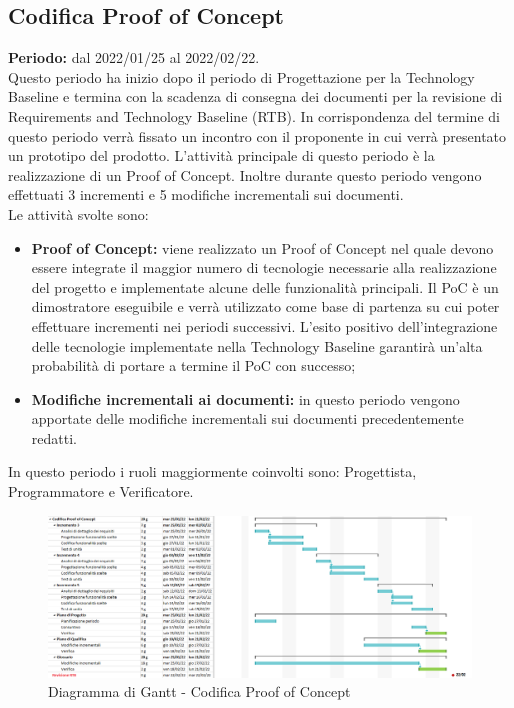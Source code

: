 
\subsection{Codifica Proof of Concept} \label{subsection:pianificazione_PoC}
\textbf{Periodo:} dal 2022/01/25 al 2022/02/22.
\bigskip
\\Questo periodo ha inizio dopo il periodo di Progettazione per la Technology Baseline e termina con la scadenza di consegna dei documenti per la revisione di Requirements and Technology Baseline (RTB).
In corrispondenza del termine di questo periodo verrà fissato un incontro con il proponente in cui verrà presentato un prototipo del prodotto.
L'attività principale di questo periodo è la realizzazione di un Proof of Concept.
Inoltre durante questo periodo vengono effettuati 3 incrementi e 5 modifiche incrementali sui documenti.
\\Le attività svolte sono:
\begin{itemize}
  \item \textbf{Proof of Concept:} viene realizzato un Proof of Concept nel quale devono essere integrate il maggior numero di tecnologie necessarie alla realizzazione del progetto e implementate alcune delle funzionalità principali.
  Il PoC è un dimostratore eseguibile e verrà utilizzato come base di partenza su cui poter effettuare incrementi nei periodi successivi.
  L'esito positivo dell'integrazione delle tecnologie implementate nella Technology Baseline garantirà un'alta probabilità di portare a termine il PoC con successo;
  \item \textbf{Modifiche incrementali ai documenti:} in questo periodo vengono apportate delle modifiche incrementali sui documenti precedentemente redatti.
\end{itemize}
In questo periodo i ruoli maggiormente coinvolti sono: Progettista, Programmatore e Verificatore.
\bigskip
\begin{figure}[H]
  \centering
   \includegraphics[scale=0.46]{immagini/poc.png}
   \caption{Diagramma di Gantt - Codifica Proof of Concept}
 \end{figure}
 \pagebreak

